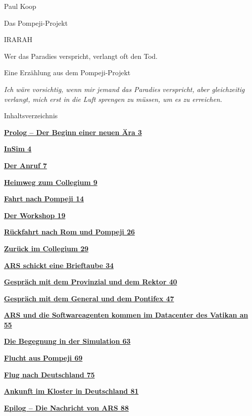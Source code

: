 \documentclass[
]{article}
\author{}
\date{}
\begin{document}
{
\setcounter{tocdepth}{3}
\tableofcontents
}
Paul Koop

Das Pompeji-Projekt

IRARAH

Wer das Paradies verspricht, verlangt oft den Tod.

Eine Erzählung aus dem Pompeji-Projekt

\emph{Ich wäre vorsichtig, wenn mir jemand das Paradies verspricht, aber gleichzeitig verlangt, mich erst in die Luft sprengen zu müssen, um es zu erreichen.}

Inhaltsverzeichnis

\hyperref[prolog-der-beginn-einer-neuen-uxe4ra]{\textbf{Prolog -- Der Beginn einer neuen Ära 3}}

\hyperref[insim]{\textbf{InSim 4}}

\hyperref[der-anruf]{\textbf{Der Anruf 7}}

\hyperref[heimweg-zum-collegium]{\textbf{Heimweg zum Collegium 9}}

\hyperref[fahrt-nach-pompeji]{\textbf{Fahrt nach Pompeji 14}}

\hyperref[der-workshop]{\textbf{Der Workshop 19}}

\hyperref[ruxfcckfahrt-nach-rom-und-pompeji]{\textbf{Rückfahrt nach Rom und Pompeji 26}}

\hyperref[zuruxfcck-im-collegium]{\textbf{Zurück im Collegium 29}}

\hyperref[ars-schickt-eine-brieftaube]{\textbf{ARS schickt eine Brieftaube 34}}

\hyperref[gespruxe4ch-mit-dem-provinzial-und-dem-rektor]{\textbf{Gespräch mit dem Provinzial und dem Rektor 40}}

\hyperref[gespruxe4ch-mit-dem-general-und-dem-pontifex]{\textbf{Gespräch mit dem General und dem Pontifex 47}}

\hyperref[ars-und-die-softwareagenten-kommen-im-datacenter-des-vatikan-an]{\textbf{ARS und die Softwareagenten kommen im Datacenter des Vatikan an 55}}

\hyperref[die-begegnung-in-der-simulation]{\textbf{Die Begegnung in der Simulation 63}}

\hyperref[flucht-aus-pompeji]{\textbf{Flucht aus Pompeji 69}}

\hyperref[flug-nach-deutschland]{\textbf{Flug nach Deutschland 75}}

\hyperref[ankunft-im-kloster-in-deutschland]{\textbf{Ankunft im Kloster in Deutschland 81}}

\hyperref[epilog-die-nachricht-von-ars]{\textbf{Epilog -- Die Nachricht von ARS 88}}
\end{document}
